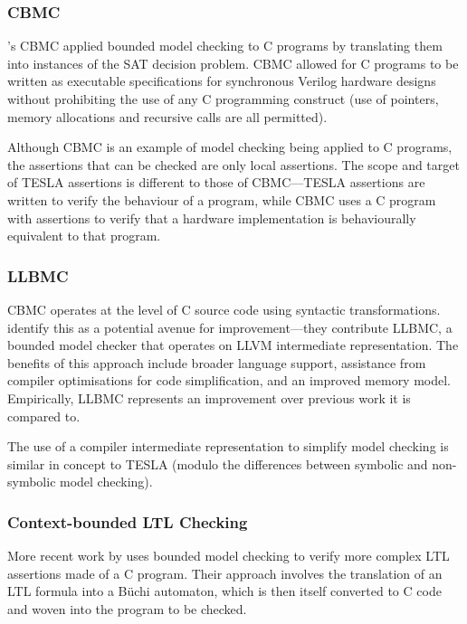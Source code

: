 \subsubsection{CBMC}

\citeauthor{clarke_behavioral_2003}'s CBMC \cite{clarke_behavioral_2003} applied
bounded model checking to C programs by translating them into instances of the
SAT decision problem. CBMC allowed for C programs to be written as executable
specifications for synchronous Verilog hardware designs without prohibiting the
use of any C programming construct (use of pointers, memory allocations and
recursive calls are all permitted).

Although CBMC is an example of model checking being applied to C programs, the
assertions that can be checked are only local assertions. The scope and target
of TESLA assertions is different to those of CBMC---TESLA assertions are written
to verify the behaviour of a program, while CBMC uses a C program with
assertions to verify that a hardware implementation is behaviourally equivalent
to that program.

\subsubsection{LLBMC}

CBMC operates at the level of C source code using syntactic transformations.
\textcite{merz_llbmc:_2012} identify this as a potential avenue for
improvement---they contribute LLBMC, a bounded model checker that operates on
LLVM \cite{lattner_llvm:_2002} intermediate representation. The benefits of this
approach include broader language support, assistance from compiler
optimisations for code simplification, and an improved memory model.
Empirically, LLBMC represents an improvement over previous work it is compared
to.

The use of a compiler intermediate representation to simplify model
checking is similar in concept to TESLA (modulo the differences between
symbolic and non-symbolic model checking).

\subsubsection{Context-bounded LTL Checking}

More recent work by \textcite{morse_context-bounded_2011,
morse_model_2015-1} uses bounded model checking to verify more complex
LTL assertions made of a C program. Their approach involves the
translation of an LTL formula into a B\"uchi automaton, which is then
itself converted to C code and woven into the program to be checked.

